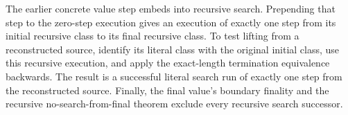 The earlier concrete value step embeds into recursive search. Prepending that
step to the zero-step execution gives an execution of exactly one step from
its initial recursive class to its final recursive class. To test lifting from
a reconstructed source, identify its literal class with the original initial
class, use this recursive execution, and apply the exact-length termination
equivalence backwards. The result is a successful literal search run of exactly
one step from the reconstructed source. Finally, the final value's boundary
finality and the recursive no-search-from-final theorem exclude every recursive
search successor.
